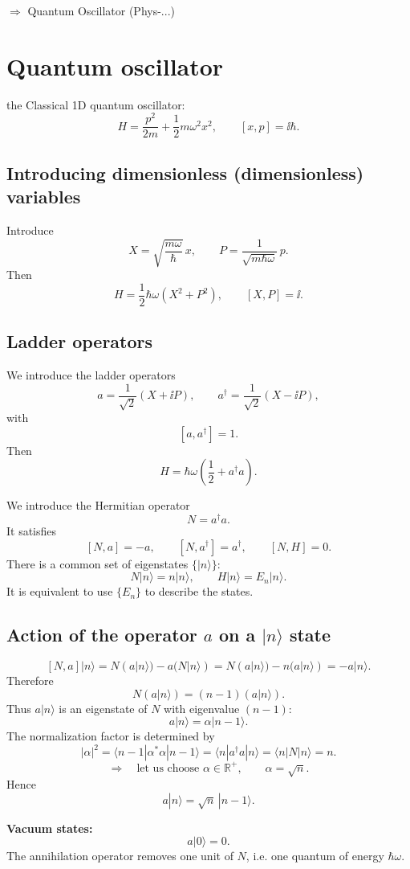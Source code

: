 \documentclass[11pt,a4paper]{article}
\begin{document}
$\Longrightarrow$ Quantum Oscillator (Phys-...)

\section*{Quantum oscillator}

the Classical 1D quantum oscillator:
\[
H=\frac{p^2}{2m}+\frac12m\omega^2x^2,
\qquad
[x,p]=\ii\hbar.
\]

\subsection*{Introducing dimensionless (dimensionless) variables}

Introduce
\[
X=\sqrt{\frac{m\omega}{\hbar}}\,x,
\qquad
P=\frac{1}{\sqrt{m\hbar\omega}}\,p.
\]
Then
\[
H=\frac12\hbar\omega(X^2+P^2),
\qquad
[X,P]=\ii.
\]

\subsection*{Ladder operators}

We introduce the ladder operators
\[
a=\frac{1}{\sqrt2}(X+\ii P),
\qquad
a^\dagger=\frac{1}{\sqrt2}(X-\ii P),
\]
with
\[
[a,a^\dagger]=1.
\]
Then
\[
H=\hbar\omega\left(\frac12+a^\dagger a\right).
\]

We introduce the Hermitian operator
\[
N=a^\dagger a.
\]
It satisfies
\[
[N,a]=-a,
\qquad
[N,a^\dagger]=a^\dagger,
\qquad
[N,H]=0.
\]
There is a common set of eigenstates $\{|n\rangle\}$:
\[
N|n\rangle=n|n\rangle,
\qquad
H|n\rangle=E_n|n\rangle.
\]
It is equivalent to use $\{E_n\}$ to describe the states.

\subsection*{Action of the operator $a$ on a $|n\rangle$ state}

\[
[N,a]|n\rangle
=N(a|n\rangle)-a(N|n\rangle)
=N(a|n\rangle)-n(a|n\rangle)
=-a|n\rangle.
\]
Therefore
\[
N(a|n\rangle)=(n-1)(a|n\rangle).
\]
Thus $a|n\rangle$ is an eigenstate of $N$ with eigenvalue $(n-1)$:
\[
a|n\rangle=\alpha|n-1\rangle.
\]
The normalization factor is determined by
\[
|\alpha|^2
=\langle n-1|\alpha^*\alpha|n-1\rangle
=\langle n|a^\dagger a|n\rangle
=\langle n|N|n\rangle
=n.
\]
\[
\Longrightarrow\quad\text{let us choose }\alpha\in\mathbb R^+,
\qquad \alpha=\sqrt n.
\]
Hence
\[
a|n\rangle=\sqrt n\,|n-1\rangle.
\]

\textbf{Vacuum states:}
\[
a|0\rangle=0.
\]
The annihilation operator removes one unit of $N$, i.e. one quantum of energy $\hbar\omega$.
\end{document}
